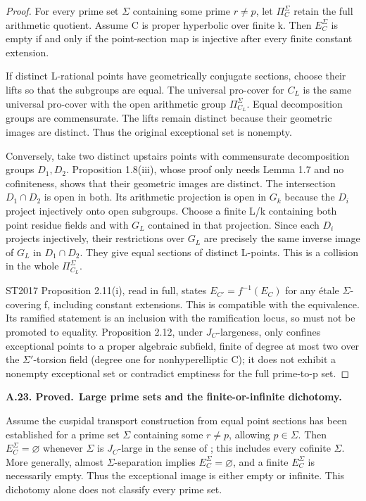 \documentclass[11pt,a4paper]{article}
\newenvironment{claim}[3]{\par\medskip\noindent\hypertarget{#1}{\textbf{#1. #2.}}\ \textbf{#3.}\par\nopagebreak\smallskip\begingroup\itshape}{\endgroup\par\smallskip}
\begin{document}
\begin{proof}

For every prime set \({\Sigma}\) containing some prime \(r\ne p\), let \({\Pi}_C^{\Sigma}\) retain the full arithmetic quotient. Assume C is proper hyperbolic over finite k. Then \(E_C^{\Sigma}\) is empty if and only if the point-section map is injective after every finite constant extension.

If distinct L-rational points have geometrically conjugate sections, choose their lifts so that the subgroups are equal. The universal pro-cover for \(C_L\) is the same universal pro-cover with the open arithmetic group \({\Pi}_{C_L}^{\Sigma}\). Equal decomposition groups are commensurate. The lifts remain distinct because their geometric images are distinct. Thus the original exceptional set is nonempty.

Conversely, take two distinct upstairs points with commensurate decomposition groups \(D_1,D_2\). Proposition 1.8(iii), whose proof only needs Lemma 1.7 and no cofiniteness, shows that their geometric images are distinct. The intersection \(D_1{\cap}D_2\) is open in both. Its arithmetic projection is open in \(G_k\) because the \(D_i\) project injectively onto open subgroups. Choose a finite L/k containing both point residue fields and with \(G_L\) contained in that projection. Since each \(D_i\) projects injectively, their restrictions over \(G_L\) are precisely the same inverse image of \(G_L\) in \(D_1{\cap}D_2\). They give equal sections of distinct L-points. This is a collision in the whole \({\Pi}_{C_L}^{\Sigma}\).

ST2017 Proposition 2.11(i), read in full, states \(E_{C'}=f^{-1}(E_C)\) for any étale \({\Sigma}\)-covering f, including constant extensions. This is compatible with the equivalence. Its ramified statement is an inclusion with the ramification locus, so must not be promoted to equality. Proposition 2.12, under \(J_C\)-largeness, only confines exceptional points to a proper algebraic subfield, finite of degree at most two over the \({\Sigma}'\)-torsion field (degree one for nonhyperelliptic C); it does not exhibit a nonempty exceptional set or contradict emptiness for the full prime-to-p set.


\end{proof}

\begin{claim}{A.23}{Proved}{Large prime sets and the finite-or-infinite dichotomy}

Assume the cuspidal transport construction from equal point sections
has been established for a prime set $\Sigma$ containing some
$r\ne p$, allowing $p\in\Sigma$. Then
$E_C^\Sigma=\varnothing$ whenever $\Sigma$ is $J_C$-large in the
sense of \cite{LA_ST2017}; this includes every cofinite $\Sigma$.
More generally, almost $\Sigma$-separation implies
$E_C^\Sigma=\varnothing$, and a finite $E_C^\Sigma$ is necessarily
empty. Thus the exceptional image is either empty or infinite.
This dichotomy alone does not classify every prime set.

\end{claim}
\end{document}
